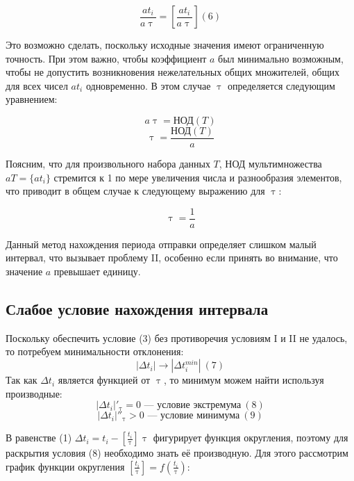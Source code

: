 \documentclass[12pt]{report}
\let\tau\uptau
\begin{document}
$$\frac{at_i}{a\tau}=\left[ \frac{at_i}{a\tau} \right] (6)$$

Это возможно сделать, поскольку исходные значения имеют ограниченную точность. При этом важно, чтобы коэффициент $a$ был минимально возможным, чтобы не допустить возникновения нежелательных общих множителей, общих для всех чисел $at_i$ одновременно. В этом случае $\tau$ определяется следующим уравнением:

$$a\tau=\text{НОД}(T)$$
$$\tau=\frac{\text{НОД}(T)}{a}$$

Поясним, что для произвольного набора данных $T$, НОД мультимножества $aT=\{at_i\}$ стремится к 1 по мере увеличения числа и разнообразия элементов, что приводит в общем случае к следующему выражению для $\tau$:

$$\tau=\frac{1}{a}$$

Данный метод нахождения периода отправки определяет слишком малый интервал, что вызывает проблему II, особенно если принять во внимание, что значение $a$ превышает единицу.

\subsection{Слабое условие нахождения интервала}
Поскольку обеспечить условие (3) без противоречия условиям I и II не удалось, то потребуем минимальности отклонения:
$$|\Delta t_i|\rightarrow|\Delta t_i^{min}|\ (7)$$
Так как $\Delta t_i$ является функцией от $\tau$, то минимум можем найти используя производные:
$$|\Delta t_i|'_{\tau}=0\text{ — условие экстремума}\ (8)$$ 
$$|\Delta t_i|''_{\tau}>0\text{ — условие минимума}\ (9)$$

В равенстве (1) $\Delta t_i=t_i-\left[\frac{t_i}{\tau}\right]\tau$ фигурирует функция округления, поэтому для раскрытия условия (8) необходимо знать её производную. Для этого рассмотрим график функции округления $\left[\frac{t_i}{\tau}\right]=f(\frac{t_i}{\tau})$:
\end{document}
